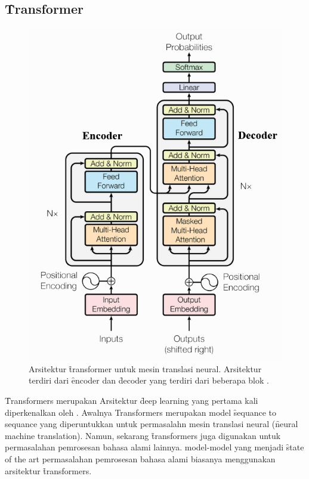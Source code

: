 \chapter{\babTiga}
\label{bab:3}

\noindent{}

\section{\f{Transformer}}

\begin{figure}
	\centering
	\includegraphics[width=0.7\linewidth]{assets/pics/transformers_seq.png}
	\caption{Arsitektur \f{transformer} untuk mesin translasi neural. Arsitektur terdiri dari \f{encoder} dan \f{decoder} yang terdiri dari beberapa blok \citep{transformerori}.}
	\label{fig:transformer}
\end{figure}

\f{Transformers} merupakan Arsitektur \f{deep learning} yang pertama kali diperkenalkan oleh \cite{transformerori}. Awalnya Transformers merupakan model \f{sequance to sequance} yang diperuntukkan untuk permasalahn mesin translasi neural (\f{neural machine translation}). Namun, sekarang \f{transformers} juga digunakan untuk permasalahan pemrosesan bahasa alami lainnya. model-model yang menjadi \f{state of the art} permasalahan pemrosesan bahasa alami biasanya menggunakan arsitektur \f{transformers}.

